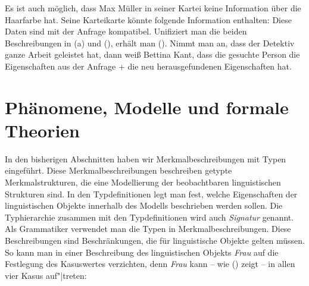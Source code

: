 Es ist auch möglich, dass Max Müller in seiner Kartei keine Information über die Haarfarbe hat. Seine Karteikarte
könnte folgende Information enthalten:
\ea
{}
\z
Diese Daten sind mit der Anfrage kompatibel. Unifiziert man die beiden Beschreibungen in (a) und (),
erhält man (). Nimmt man an, dass der Detektiv ganze Arbeit geleistet hat, dann weiß Bettina Kant,
dass die gesuchte Person die Eigenschaften aus der Anfrage + die neu herausgefundenen Eigenschaften hat.

\section{Phänomene, Modelle und formale Theorien}
\label{sec-modelle-theorien}

In den bisherigen Abschnitten haben wir Merkmalbeschreibungen mit Typen eingeführt. Diese
Merkmalbeschreibungen beschreiben getypte Merkmalstrukturen, die eine Modellierung der beobachtbaren
linguistischen Strukturen sind. In den Typdefinitionen legt man fest, welche
Eigenschaften der linguistischen Objekte innerhalb des Modells beschrieben werden sollen. Die Typhierarchie zusammen mit den Typdefinitionen wird
auch \emph{Signatur} genannt. %
Als Grammatiker verwendet man die Typen in
Merkmalbeschreibungen. Diese Beschreibungen sind Beschränkungen, die für linguistische Objekte
gelten müssen. So kann man \zb in einer Beschreibung des linguistischen Objekts \emph{Frau} auf die
Festlegung des Kasuswertes verzichten, denn \emph{Frau} kann -- wie () zeigt -- in allen vier
Kasus auf"|treten:

